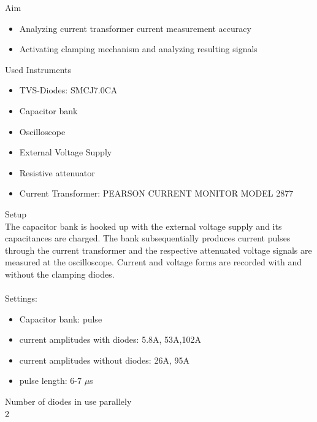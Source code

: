 {\Large Aim}
\begin{itemize}
\item Analyzing current transformer current measurement accuracy 
\item Activating clamping mechanism and analyzing resulting signals
\end{itemize}
{\Large Used Instruments}
\begin{itemize}
 \item TVS-Diodes: SMCJ7.0CA
 \item Capacitor bank
 \item Oscilloscope
 \item External Voltage Supply
 \item Resistive attenuator
 \item Current Transformer: PEARSON CURRENT MONITOR MODEL 2877
\end{itemize}
{\Large Setup} \\
The capacitor bank is hooked up with the external voltage supply and its capacitances are charged.
The bank subsequentially produces current pulses through the current transformer and the respective attenuated voltage signals are measured at the oscilloscope.
Current and voltage forms are recorded with and without the clamping diodes.\\
\\
{\Large Settings:} \newline
\begin{itemize}
\item Capacitor bank:  pulse\\
\item current amplitudes with diodes: 5.8A, 53A,102A\\
\item current amplitudes without diodes: 26A, 95A\\ 
\item pulse length: 6-7 $\mu$s
\end{itemize}
{\Large Number of diodes in use parallely} \\
2 \\


